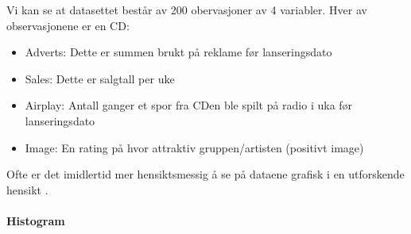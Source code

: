\documentclass[
]{article}
\providecommand{\tightlist}{%
  \setlength{\itemsep}{0pt}\setlength{\parskip}{0pt}}
\begin{document}
Vi kan se at datasettet består av 200 obervasjoner av 4 variabler. Hver av observasjonene er en CD:

\begin{itemize}
\tightlist
\item
  Adverts: Dette er summen brukt på reklame før lanseringsdato
\item
  Sales: Dette er salgtall per uke
\item
  Airplay: Antall ganger et spor fra CDen ble spilt på radio i uka før lanseringsdato
\item
  Image: En rating på hvor attraktiv gruppen/artisten (positivt image)
\end{itemize}

Ofte er det imidlertid mer hensiktsmessig å se på dataene grafisk i en utforskende hensikt \citep{tukeyExploratoryDataAnalysis1977}.

\hypertarget{histogram}{%
\paragraph{Histogram}\label{histogram}}
\end{document}

